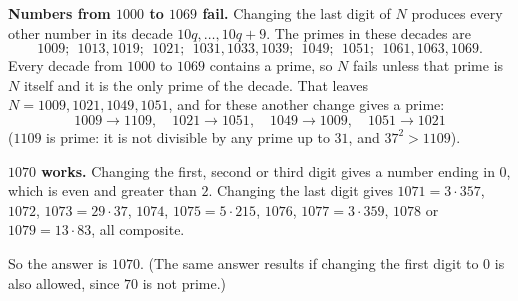\textbf{Numbers from $1000$ to $1069$ fail.} Changing the last digit of $N$ produces every other number in its decade $10q,\dots,10q+9$. The primes in these decades are
\[
1009;\ \ 1013,1019;\ \ 1021;\ \ 1031,1033,1039;\ \ 1049;\ \ 1051;\ \ 1061,1063,1069 .
\]
Every decade from $1000$ to $1069$ contains a prime, so $N$ fails unless that prime is $N$ itself and it is the only prime of the decade. That leaves $N=1009,1021,1049,1051$, and for these another change gives a prime:
\[
1009\to1109,\quad 1021\to1051,\quad 1049\to1009,\quad 1051\to1021
\]
($1109$ is prime: it is not divisible by any prime up to $31$, and $37^2>1109$).

\textbf{$1070$ works.} Changing the first, second or third digit gives a number ending in $0$, which is even and greater than $2$. Changing the last digit gives $1071=3\cdot357$, $1072$, $1073=29\cdot37$, $1074$, $1075=5\cdot215$, $1076$, $1077=3\cdot359$, $1078$ or $1079=13\cdot83$, all composite.

So the answer is $\boxed{1070}$. (The same answer results if changing the first digit to $0$ is also allowed, since $70$ is not prime.)
